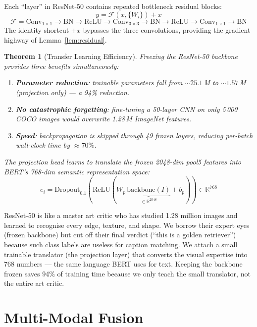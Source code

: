 \documentclass[12pt, a4paper]{article}
\theoremstyle{definition}
\theoremstyle{plain}
\newtheorem{theorem}{Theorem}[section]
\theoremstyle{remark}
\begin{document}
Each ``layer'' in ResNet-50 contains repeated bottleneck residual blocks:
\[
  y = \mathcal{F}(x,\{W_i\}) + x
\]
\[
  \mathcal{F} = \text{Conv}_{1\times1}\!\to\!\text{BN}\!\to\!\text{ReLU}\!\to\!
  \text{Conv}_{3\times3}\!\to\!\text{BN}\!\to\!\text{ReLU}\!\to\!
  \text{Conv}_{1\times1}\!\to\!\text{BN}
\]
The identity shortcut $+x$ bypasses the three convolutions, providing the
gradient highway of Lemma~\ref{lem:residual}.

\begin{theorem}[Transfer Learning Efficiency]
\label{thm:transfer}
Freezing the ResNet-50 backbone provides three benefits simultaneously:
\begin{enumerate}[nosep]
\item \textbf{Parameter reduction}: trainable parameters fall from
  $\sim\!25.1$\,M to $\sim\!1.57$\,M (projection only) --- a 94\% reduction.
\item \textbf{No catastrophic forgetting}: fine-tuning a 50-layer CNN on only
  5\,000 COCO images would overwrite 1.28\,M ImageNet features.
\item \textbf{Speed}: backpropagation is skipped through 49 frozen layers,
  reducing per-batch wall-clock time by $\approx70\%$.
\end{enumerate}
The projection head learns to \emph{translate} the frozen 2048-dim pool5
features into BERT's 768-dim semantic representation space:
\[
  e_i = \text{Dropout}_{0.1}\!\left(\text{ReLU}\!\left(W_p\,
  \underbrace{\text{backbone}(I)}_{\in\mathbb{R}^{2048}} + b_p\right)\right)
  \in \mathbb{R}^{768}
\]
\end{theorem}

\begin{tcolorbox}[layman]
ResNet-50 is like a master art critic who has studied 1.28 million images
and learned to recognise every edge, texture, and shape.  We borrow their
expert eyes (frozen backbone) but cut off their final verdict (``this is
a golden retriever'') because such class labels are useless for caption
matching.  We attach a small trainable translator (the projection layer)
that converts the visual expertise into 768 numbers --- the same language
BERT uses for text.  Keeping the backbone frozen saves 94\% of training
time because we only teach the small translator, not the entire art critic.
\end{tcolorbox}

\section{Multi-Modal Fusion}
\label{sec:fusion}
\end{document}
